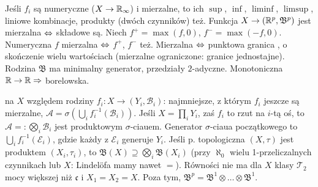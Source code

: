
Jeśli  $f_i$ są numeryczne ($X \to \mathbb{R}_\infty$) i mierzalne, to ich $\sup$, $\inf$, $\liminf$, $\limsup$, liniowe kombinacje, produkty (dwóch czynników) też.
Funkcja $X \to (\mathbb{R}^p, \mathfrak B^p)$ jest mierzalna $\Leftrightarrow$ składowe są.
Niech $f^+ = \max(f,0)$, $f^- = \max (-f, 0)$.
Numeryczna $f$ mierzalna $\Leftrightarrow$ $f^+$, $f^-$ też.
Mierzalna $\Leftrightarrow$ punktowa granica , o skończenie wielu wartościach (mierzalne ograniczone: granice jednostajne).
Rodzina $\mathfrak B$ ma minimalny generator, przedziały $2$-adyczne.
Monotoniczna $\mathbb{R} \to \mathbb{R} \Rightarrow$ borelowska.

  na $X$ względem rodziny $f_i \colon X \to (Y_i, \mathcal B_i)$: najmniejsze, z którym $f_i$ jeszcze są mierzalne, $\mathcal A = \sigma(\bigcup_i f_i^{-1} (\mathcal B_i))$.
Jeśli $X = \prod_i Y_i$, zaś $f_i$ to rzut na $i$-tą oś, to $\mathcal A =: \bigotimes_i \mathcal B_i$ jest produktowym $\sigma$-ciauem.
Generator $\sigma$-ciaua początkowego to $\bigcup_i f_i^{-1} (\mathcal E_i)$, gdzie każdy z $\mathcal E_i$ generuje $Y_i$.
Jeśli p. topologiczna $(X, \tau)$ jest produktem $(X_i, \tau_i)$, to $\mathfrak B(X) \supseteq \bigotimes_i \mathfrak B (X_i)$ (przy $\aleph_0$ wielu 1-przeliczalnych czynnikach lub $X$: Lindelöfa mamy nawet $=$).
Równości nie ma dla $X$ klasy $\mathcal T_2$ mocy większej niż $\mathfrak c$ i $X_1 = X_2 = X$.
Poza tym, $\mathfrak B^p = \mathfrak B^1 \otimes \ldots \otimes \mathfrak B^1$.
